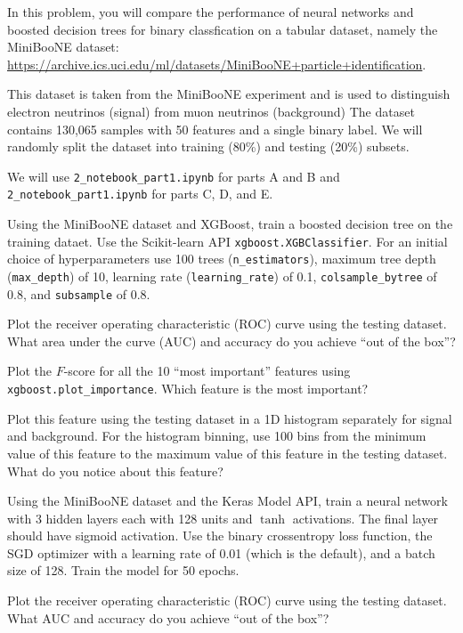 In this problem, you will compare the performance of neural networks and boosted decision trees for binary classfication on a tabular dataset, namely the MiniBooNE dataset: \url{https://archive.ics.uci.edu/ml/datasets/MiniBooNE+particle+identification}.

This dataset is taken from the MiniBooNE experiment and is used to distinguish electron neutrinos (signal) from muon neutrinos (background)
The dataset contains 130,065 samples with 50 features and a single binary label.
We will randomly split the dataset into training (80\%) and testing (20\%) subsets.

We will use \texttt{2_notebook_part1.ipynb} for parts A and B and \texttt{2_notebook_part1.ipynb} for parts C, D, and E.

\begin{problem}[15]
Using the MiniBooNE dataset and XGBoost, train a boosted decision tree on the training dataet.
Use the Scikit-learn API \texttt{xgboost.XGBClassifier}.
For an initial choice of hyperparameters use 100 trees (\texttt{n_estimators}), maximum tree depth (\texttt{max_depth}) of 10, learning rate (\texttt{learning_rate}) of 0.1, \texttt{colsample_bytree} of 0.8, and \texttt{subsample} of 0.8.

Plot the receiver operating characteristic (ROC) curve using the testing dataset.
What area under the curve (AUC) and accuracy do you achieve ``out of the box''?
\end{problem}


\begin{problem}[5]
Plot the $F$-score for all the 10 ``most important'' features using \texttt{xgboost.plot_importance}.
Which feature is the most important?

Plot this feature using the testing dataset in a 1D histogram separately for signal and background.
For the histogram binning, use 100 bins from the minimum value of this feature to the maximum value of this feature in the testing dataset.
What do you notice about this feature?
\end{problem}


\begin{problem}[15]
Using the MiniBooNE dataset and the Keras Model API, train a neural network with 3 hidden layers each with 128 units and $\tanh$ activations.
The final layer should have sigmoid activation.
Use the binary crossentropy loss function, the SGD optimizer with a learning rate of 0.01 (which is the default), and a batch size of 128.
Train the model for 50 epochs.

Plot the receiver operating characteristic (ROC) curve using the testing dataset.
What AUC and accuracy do you achieve ``out of the box''?
\end{problem}


